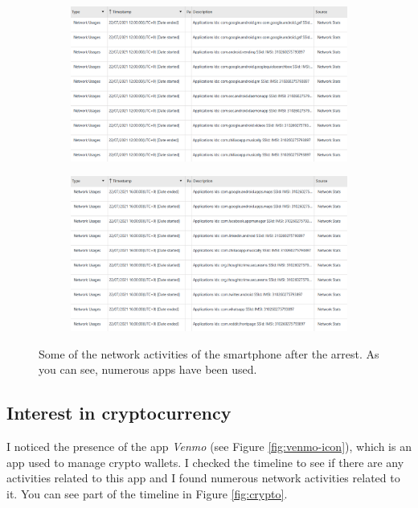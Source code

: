 \documentclass[12pt]{article}
\begin{document}
\begin{figure}[!ht]
    \centering
    \begin{subfigure}[b]{\textwidth}
        \centering
        \includegraphics[width=\textwidth]{images/pbp.png}
        \caption{}
    \end{subfigure}
    \hspace{2 pt}
    \begin{subfigure}[b]{\textwidth}
        \centering
        \includegraphics[width=\textwidth]{images/pbp2.png}
        \caption{}
    \end{subfigure}
    \caption{Some of the network activities of the smartphone after the arrest. As you can see, numerous apps have been used.}
    \label{fig:pbp}
\end{figure}

\subsection{Interest in cryptocurrency}

I noticed the presence of the app \textit{Venmo} (see Figure \ref{fig:venmo-icon}), which is an app used to manage crypto wallets. I checked the timeline to see if there are any activities related to this app and I found numerous network activities related to it. You can see part of the timeline in Figure \ref{fig:crypto}.
\end{document}
